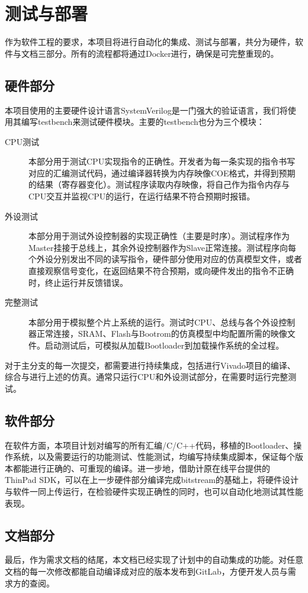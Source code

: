\chapter{测试与部署}

作为软件工程的要求，本项目将进行自动化的集成、测试与部署，共分为硬件，软件与文档三部分。所有的流程都将通过Docker进行，确保是可完整重现的。

\section{硬件部分}
\label{section:test_hardware}

本项目使用的主要硬件设计语言SystemVerilog是一门强大的验证语言，我们将使用其编写testbench来测试硬件模块。主要的testbench也分为三个模块：

\begin{description}
    \item[CPU测试] 本部分用于测试CPU实现指令的正确性。开发者为每一条实现的指令书写对应的汇编测试代码，通过编译器转换为内存映像COE格式，并得到预期的结果（寄存器变化）。测试程序读取内存映像，将自己作为指令内存与CPU交互并监视CPU的运行，在运行结果不符合预期时报错。
    \item[外设测试] 本部分用于测试外设控制器的实现正确性（主要是时序）。测试程序作为Master挂接于总线上，其余外设控制器作为Slave正常连接。测试程序向每个外设分别发出不同的读写指令，硬件部分使用对应的仿真模型文件，或者直接观察信号变化，在返回结果不符合预期，或向硬件发出的指令不正确时，终止运行并反馈错误。
    \item[完整测试] 本部分用于模拟整个片上系统的运行。测试时CPU、总线与各个外设控制器正常连接，SRAM、Flash与Bootrom的仿真模型中均配置所需的映像文件。启动测试后，可模拟从加载Bootloader到加载操作系统的全过程。
\end{description}

对于主分支的每一次提交，都需要进行持续集成，包括进行Vivado项目的编译、综合与进行上述的仿真。通常只运行CPU和外设测试部分，在需要时运行完整测试。

\section{软件部分}

在软件方面，本项目计划对编写的所有汇编/C/C++代码，移植的Bootloader、操作系统，以及需要运行的功能测试、性能测试，均编写持续集成脚本，保证每个版本都能进行正确的、可重现的编译。进一步地，借助计原在线平台提供的 ThinPad SDK，可以在上一步硬件部分编译完成bitstream的基础上，将硬件设计与软件一同上传运行，在检验硬件实现正确性的同时，也可以自动化地测试其性能表现。

\section{文档部分}

最后，作为需求文档的结尾，本文档已经实现了计划中的自动集成的功能。对任意文档的每一次修改都能自动编译成对应的版本发布到GitLab，方便开发人员与需求方的查阅。